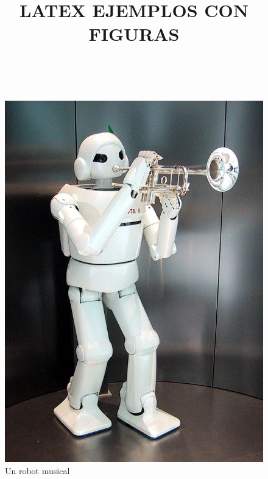 \documentclass{article}
\title{LATEX EJEMPLOS CON FIGURAS}
\begin{document}
    \maketitle
   \blindtext[2]\\


    \begin{figure}[ht]
        \begin{flushright}
            \includegraphics[scale=0.3]{robot1.jpg}
            \caption{Un robot musical}
            \label{robot1}
        \end{flushright}
    \end{figure}
\end{document}
